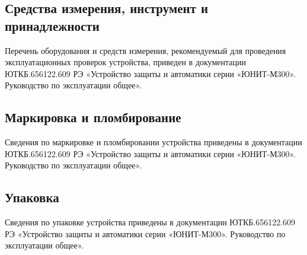 \color{unimain}\subsection{Средства измерения, инструмент и принадлежности}\color{black}
Перечень оборудования и средств измерения, рекомендуемый для проведения эксплуатационных проверок устройства, приведен в документации ЮТКБ.656122.609 РЭ «Устройство защиты и автоматики серии «ЮНИТ-М300». Руководство по эксплуатации общее».

\color{unimain}\subsection{Маркировка и пломбирование}\color{black}
Сведения по маркировке и пломбировании устройства приведены в документации ЮТКБ.656122.609 РЭ «Устройство защиты и автоматики серии «ЮНИТ-М300». Руководство по эксплуатации общее».

\color{unimain}\subsection{Упаковка}\color{black}
Сведения по упаковке устройства приведены в документации ЮТКБ.656122.609 РЭ «Устройство защиты и автоматики серии «ЮНИТ-М300». Руководство по эксплуатации общее».